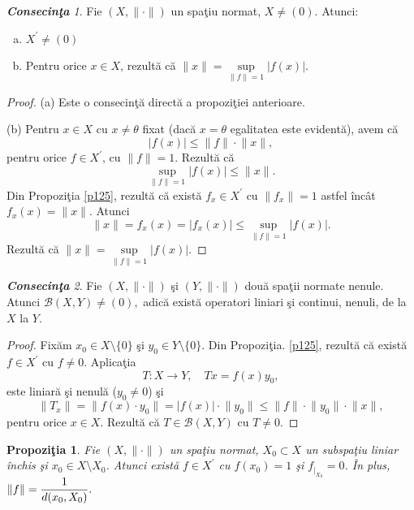 \documentclass[ a4paper, 12pt]{report}
\newtheorem{prop}[theorem]{\bf Propozi\c tia }
\theoremstyle{definition}
\theoremstyle{remark}
\newtheorem{cons}{\bf Consecin\c ta }[section]
\numberwithin{equation}{section}
\begin{document}
\begin{cons}\label{c121}
Fie $(X,\lVert \cdot \rVert)$ un spa\c tiu normat, $X \neq (0)$. Atunci:
\begin{enumerate}[(a)]
\item $X^{'} \neq (0)$
\item Pentru orice $x \in X$, rezult\u a c\u a $\lVert x \rVert = \sup\limits_{\lVert f \rVert = 1}\lvert f(x) \rvert$.
\end{enumerate}
\end{cons}

\begin{proof}
(a) Este o consecin\c t\u a  direct\u a a propozi\c tiei anterioare.

(b) Pentru $x \in X$ cu $x \neq \theta$ fixat (dac\u a $x = \theta$ egalitatea este evident\u a), avem c\u a
$$\lvert f(x) \rvert \leq \lVert f \rVert \cdot \lVert x \rVert,$$ pentru orice $f \in X^{'}$, cu $\lVert f \rVert = 1$. Rezult\u a c\u a
$$\sup\limits_{\lVert f \rVert = 1} \lvert f(x) \rvert \leq \lVert x \rVert.$$
Din Propozi\c tia \ref{p125}, rezult\u a c\u a exist\u a $f_x \in X^{'}$ cu $\lVert f_x \rVert = 1$ astfel \^inc\^at $f_x(x) = \lVert  x \rVert$. Atunci
$$\lVert x \rVert = f_x(x) = \lvert f_x(x) \rvert \leq \sup\limits_{\lVert f \rVert = 1}\lvert f(x) \rvert.$$
Rezult\u a c\u a $\lVert x \rVert = \sup\limits_{\lVert f \rVert = 1}\lvert f(x) \rvert.$
\end{proof}

\begin{cons}\label{c122}
Fie $(X, \lVert \cdot \rVert)$ \c si $(Y,\lVert \cdot  \rVert)$ dou\u a spa\c tii normate nenule. Atunci $\mathcal{B}(X,Y) \neq (0),$ adic\u a exist\u a operatori liniari \c si continui, nenuli, de la $X$ la $Y$.
\end{cons}

\begin{proof}
Fix\u am $x_0 \in X\setminus \{ 0 \}$ \c si $y_0 \in Y \setminus \{ 0 \}$. Din Propozi\c tia. \ref{p125}, rezult\u a c\u a exist\u a $f \in X^{'}$ cu $f \neq 0.$
Aplica\c tia
$$T : X \rightarrow Y,\quad  Tx = f(x)  y_0,$$ este liniar\u a \c si nenul\u a ($y_0 \neq 0$) \c si
$$\lVert T_x \rVert = \lVert f(x) \cdot y_0 \rVert = \lvert f(x) \rvert \cdot \lVert y_0 \rVert \leq \lVert f  \rVert \cdot \lVert y_0 \rVert \cdot \lVert x \rVert,$$ pentru orice $x \in X$. Rezult\u a c\u a $T \in \mathcal{B}(X,Y) $ cu $T \neq 0.$
\end{proof}

\begin{prop}\label{p126}
Fie $(X,\lVert \cdot \rVert)$ un spa\c tiu normat, $X_0 \subset X$ un subspa\c tiu liniar \^inchis \c si $x_0 \in X \setminus X_0$.
Atunci exist\u a $f \in X^{'}$ cu $f(x_0) = 1$ \c si $f_{|_{X_0}} = 0$.
\^In plus, $\lVert f \rVert = \displaystyle\frac{1}{d(x_0,X_0)}.$
\end{prop}
\end{document}
